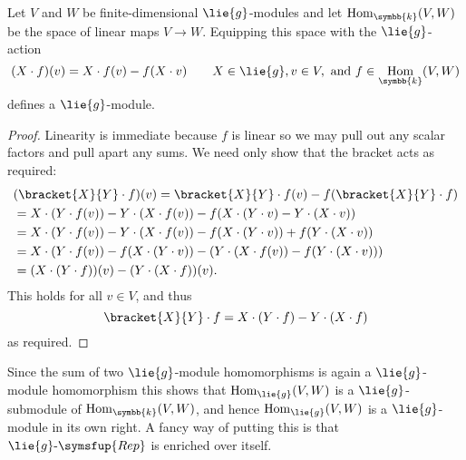 \documentclass[fleqn]{NotesClass}
\makeatletter
\renewcommand{\field}{\symbb{k}}
\newcommand{\c@egory}[1]{\symsfup{#1}}
\newcommand{\Rep}[1][\lie{g}]{#1\text{-}\c@egory{Rep}}
\DeclareMathOperator{\Hom}{Hom}
\makeatother
\begin{document}
    \begin{lma}{}{}
        Let \(V\) and \(W\) be finite-dimensional \(\lie{g}\)-modules and let \(\Hom_{\field}(V, W)\) be the space of linear maps \(V \to W\).
        Equipping this space with the \(\lie{g}\)-action
        \begin{equation}
            (X \cdot f)(v) = X \cdot f(v) - f(X \cdot v) \qquad X \in \lie{g}, v \in V, \text{ and } f \in \Hom_{\field}(V, W)
        \end{equation}
        defines a \(\lie{g}\)-module.
        \begin{proof}
            Linearity is immediate because \(f\) is linear so we may pull out any scalar factors and pull apart any sums.
            We need only show that the bracket acts as required:
            \begin{align}
                &(\bracket{X}{Y} \cdot f)(v) = \bracket{X}{Y} \cdot f(v) - f(\bracket{X}{Y} \cdot f)\\
                &= X \cdot (Y \cdot f(v)) - Y \cdot (X \cdot f(v)) - f(X \cdot (Y \cdot v) - Y \cdot (X \cdot v)) \notag\\
                &= X \cdot (Y \cdot f(v)) - Y \cdot (X \cdot f(v)) - f(X \cdot (Y \cdot v)) + f(Y \cdot (X \cdot v)) \notag\\
                &= X \cdot (Y \cdot f(v)) - f(X \cdot (Y \cdot v)) - (Y \cdot (X \cdot f(v)) - f(Y \cdot (X \cdot v))) \notag\\
                &= (X \cdot (Y \cdot f))(v) - (Y \cdot (X \cdot f))(v).
            \end{align}
            This holds for all \(v \in V\), and thus
            \begin{equation}
                \bracket{X}{Y} \cdot f = X \cdot (Y \cdot f) - Y \cdot (X \cdot f)
            \end{equation}
            as required.
        \end{proof}
    \end{lma}
    
    Since the sum of two \(\lie{g}\)-module homomorphisms is again a \(\lie{g}\)-module homomorphism this shows that \(\Hom_{\lie{g}}(V, W)\) is a \(\lie{g}\)-submodule of \(\Hom_{\field}(V, W)\), and hence \(\Hom_{\lie{g}}(V, W)\) is a \(\lie{g}\)-module in its own right.
    A fancy way of putting this is that \(\Rep\) is enriched over itself.
    
\end{document}
